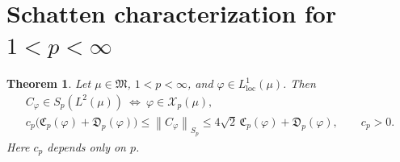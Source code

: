 \documentclass[11pt]{amsart}
\newtheorem{theorem}{Theorem}
\newcommand{\X}{\mathcal X}
\newcommand{\norm}[1]{\left\|#1\right\|}
\begin{document}
\section{Schatten characterization for \texorpdfstring{$1<p<\infty$}{1 < p < infinity}}
\begin{theorem}\label{main}
Let $\mu\in\mathfrak M$, $1<p<\infty$, and
$\varphi\in L^1_{\mathrm{loc}}(\mu)$. Then
\begin{gather*}
 C_\varphi\in S_p(L^2(\mu))
       \ \Longleftrightarrow\ \varphi\in\X_p(\mu),\\
 c_p\big(\mathfrak C_p(\varphi)+\mathfrak D_p(\varphi)\big)
 \le\norm{C_\varphi}_{S_p}
 \le4\sqrt2\,\mathfrak C_p(\varphi)+\mathfrak D_p(\varphi),\qquad
 c_p>0.
\end{gather*}
Here $c_p$ depends only on $p$.
\end{theorem}
\end{document}
